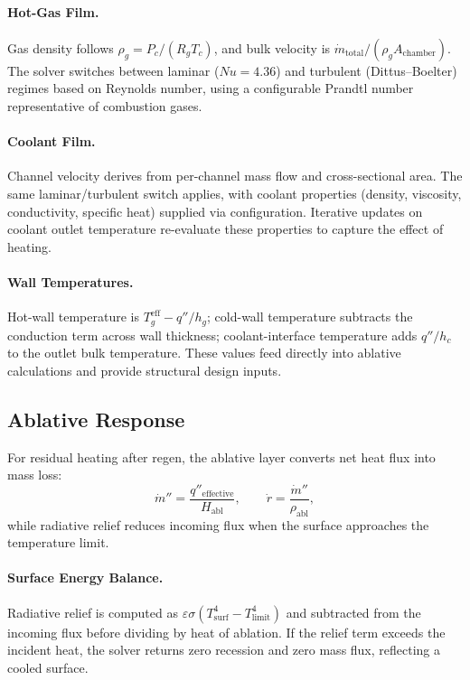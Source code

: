 \documentclass[12pt]{article}
\begin{document}
\paragraph{Hot-Gas Film.}  Gas density follows $\rho_g = P_c/(R_g T_c)$, and bulk velocity is $\dot{m}_{\text{total}}/(\rho_g A_{\text{chamber}})$.  The solver switches between laminar ($Nu=4.36$) and turbulent (Dittus--Boelter) regimes based on Reynolds number, using a configurable Prandtl number representative of combustion gases.

\paragraph{Coolant Film.}  Channel velocity derives from per-channel mass flow and cross-sectional area.  The same laminar/turbulent switch applies, with coolant properties (density, viscosity, conductivity, specific heat) supplied via configuration.  Iterative updates on coolant outlet temperature re-evaluate these properties to capture the effect of heating.

\paragraph{Wall Temperatures.}  Hot-wall temperature is $T_g^{\text{eff}} - q''/h_g$; cold-wall temperature subtracts the conduction term across wall thickness; coolant-interface temperature adds $q''/h_c$ to the outlet bulk temperature.  These values feed directly into ablative calculations and provide structural design inputs.

\subsection{Ablative Response}
For residual heating after regen, the ablative layer converts net heat flux into mass loss:
\[
\dot{m}'' = \frac{q''_{\text{effective}}}{H_{\text{abl}}},
\qquad
\dot{r} = \frac{\dot{m}''}{\rho_{\text{abl}}},
\]
while radiative relief reduces incoming flux when the surface approaches the temperature limit.

\paragraph{Surface Energy Balance.}  Radiative relief is computed as $\varepsilon \sigma (T_{\text{surf}}^{4} - T_{\text{limit}}^{4})$ and subtracted from the incoming flux before dividing by heat of ablation.  If the relief term exceeds the incident heat, the solver returns zero recession and zero mass flux, reflecting a cooled surface.
\end{document}
